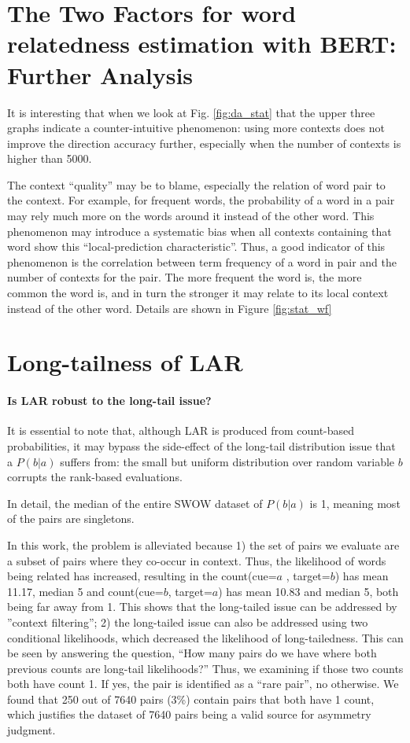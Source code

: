 \documentclass[letterpaper]{article} %
\begin{document}
\section{The Two Factors for word relatedness estimation with BERT: Further Analysis}

It is interesting that when we look at Fig. \ref{fig:da_stat} that the upper three graphs indicate a counter-intuitive phenomenon: using more contexts does not improve the direction accuracy further, especially when the number of contexts is higher than 5000. 

The context ``quality'' may be to blame, especially the relation of word pair to the context. For example, for frequent words, the probability of a word in a pair may rely much more on the words around it instead of the other word. This phenomenon may introduce a systematic bias when all contexts containing that word show this ``local-prediction characteristic''. Thus, a good indicator of this phenomenon is the correlation between term frequency of a word in pair and the number of contexts for the pair. The more frequent the word is, the more common the word is, and in turn the stronger it may relate to its local context instead of the other word. Details are shown in Figure \ref{fig:stat_wf}


\section{Long-tailness of LAR}
\paragraph{Is LAR robust to the long-tail issue?} It is essential to note that, although LAR is produced from count-based probabilities, it may bypass the side-effect of the long-tail distribution issue that a $P(b|a)$ suffers from: the small but uniform distribution over random variable $b$ corrupts the rank-based evaluations. 

In detail, the median of the entire SWOW dataset of $P(b|a)$ is 1, meaning most of the pairs are singletons. 

In this work, the problem is alleviated because 1) the set of pairs we evaluate are a subset of pairs where they co-occur in context. Thus, the likelihood of words being related has increased, resulting in the count(cue=$a$ , target=$b$) has mean 11.17, median 5 and count(cue=$b$, target=$a$) has mean 10.83 and median 5, both being far away from 1. This shows that the long-tailed issue can be addressed by ''context filtering''; 2) the long-tailed issue can also be addressed using two conditional likelihoods, which decreased the likelihood of long-tailedness. This can be seen by answering the question, ``How many pairs do we have where both previous counts are long-tail likelihoods?'' Thus, we examining if those two counts both have count 1. If yes, the pair is identified as a ``rare pair'', no otherwise. We found that 250 out of 7640 pairs (3\%) contain pairs that both have 1 count, which justifies the dataset of 7640 pairs being a valid source for asymmetry judgment.
\end{document}
